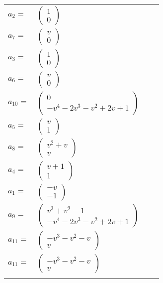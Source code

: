 \documentclass[1p]{elsarticle_modified}
\theoremstyle{definition}
\begin{document}
\begin{tabular}{m{7pt} m{180pt} m{7pt} m{180pt} }
\flushright $a_{2}=$&$\begin{pmatrix}1\\0\end{pmatrix}$ \\
\flushright $a_{7}=$&$\begin{pmatrix}v\\0\end{pmatrix}$ \\
\flushright $a_{3}=$&$\begin{pmatrix}1\\0\end{pmatrix}$ \\
\flushright $a_{6}=$&$\begin{pmatrix}v\\0\end{pmatrix}$ \\
\flushright $a_{10}=$&$\begin{pmatrix}0\\- v^4-2 v^3- v^2+2 v+1\end{pmatrix}$ \\
\flushright $a_{5}=$&$\begin{pmatrix}v\\1\end{pmatrix}$ \\
\flushright $a_{8}=$&$\begin{pmatrix}v^2+v\\v\end{pmatrix}$ \\
\flushright $a_{4}=$&$\begin{pmatrix}v+1\\1\end{pmatrix}$ \\
\flushright $a_{1}=$&$\begin{pmatrix}- v\\-1\end{pmatrix}$ \\
\flushright $a_{9}=$&$\begin{pmatrix}v^3+v^2-1\\- v^4-2 v^3- v^2+2 v+1\end{pmatrix}$ \\
\flushright $a_{11}=$&$\begin{pmatrix}- v^3- v^2- v\\v\end{pmatrix}$\\ \flushright $a_{11}=$&$\begin{pmatrix}- v^3- v^2- v\\v\end{pmatrix}$\\&\end{tabular}
\end{document}
